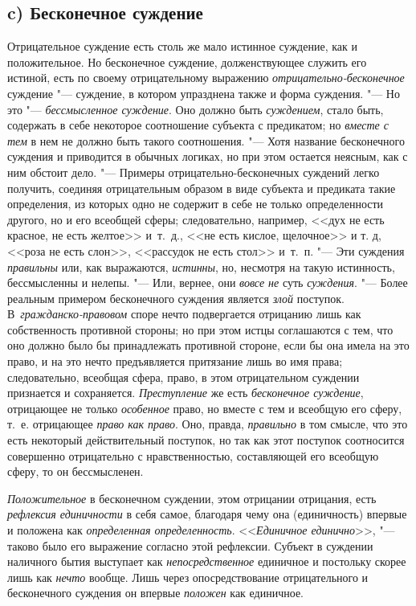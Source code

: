 \subsection[c) Бесконечное суждение]{c) Бесконечное суждение}
Отрицательное суждение есть столь же мало истинное суждение,
как и положительное. Но бесконечное суждение, долженствующее служить его
истиной, есть по своему отрицательному выражению
{\em отрицательно-бесконечное}
суждение "--- суждение, в котором упразднена
также и форма суждения. "--- Но это
"--- {\em бессмысленное суждение}.
Оно должно быть
{\em суждением}, стало
быть, содержать в себе некоторое соотношение субъекта с предикатом; но
{\em вместе с тем} в нем
не должно быть такого соотношения. "--- Хотя название
бесконечного суждения и приводится в обычных логиках, но при этом остается
неясным, как с ним обстоит дело. "--- Примеры
отрицательно-бесконечных суждений легко получить, соединяя отрицательным
образом в виде субъекта и предиката такие определения, из которых одно не
содержит в себе не только определенности другого, но и его всеобщей сферы;
следовательно, например, <<дух не есть красное, не есть желтое>> и~т.~д., <<не
есть кислое, щелочное>> и т. д, <<роза не есть слон>>, <<рассудок не есть стол>>
и~т.~п. "--- Эти суждения
{\em правильны} или, как
выражаются, {\em истинны},
но, несмотря на такую истинность, бессмысленны и нелепы. "---
Или, вернее, они
{\em вовсе не} суть
{\em суждения}. "--- Более
реальным примером бесконечного суждения является
{\em злой} поступок. В~{\em гражданско-правовом}
споре нечто подвергается отрицанию лишь как собственность
противной стороны; но при этом истцы соглашаются с тем, что оно должно было
бы принадлежать противной стороне, если бы она имела на это право, и на это
нечто предъявляется притязание лишь во имя права; следовательно, всеобщая
сфера, право, в этом отрицательном суждении признается и сохраняется.
{\em Преступление} же
есть {\em бесконечное суждение},
отрицающее не только
{\em особенное} право, но
вместе с тем и всеобщую его сферу, т.~е. отрицающее
{\em право как право}.
Оно, правда,
{\em правильно} в том
смысле, что это есть некоторый действительный поступок, но так как этот
поступок соотносится совершенно отрицательно с нравственностью,
составляющей его всеобщую сферу, то он бессмысленен.

{\em Положительное} в
бесконечном суждении, этом отрицании отрицания, есть
{\em рефлексия единичности}
в себя самое, благодаря чему она (единичность) впервые и
положена как {\em определенная
определенность}. <<{\em Единичное
единично}>>, "--- таково было его выражение согласно этой
рефлексии. Субъект в суждении наличного бытия выступает как
{\em непосредственное}
единичное и постольку скорее лишь как
{\em нечто} вообще. Лишь
через опосредствование отрицательного и бесконечного суждения он впервые
{\em положен} как
единичное.

